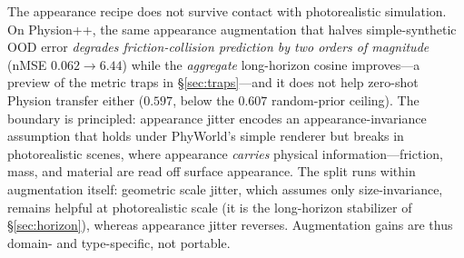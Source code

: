 The appearance recipe does not survive contact with photorealistic simulation. On Physion++, the same appearance augmentation that halves simple-synthetic OOD error \emph{degrades friction-collision prediction by two orders of magnitude} (nMSE $0.062\!\to\!6.44$) while the \emph{aggregate} long-horizon cosine improves---a preview of the metric traps in \S\ref{sec:traps}---and it does not help zero-shot Physion transfer either ($0.597$, below the $0.607$ random-prior ceiling). The boundary is principled: appearance jitter encodes an appearance-invariance assumption that holds under PhyWorld's simple renderer but breaks in photorealistic scenes, where appearance \emph{carries} physical information---friction, mass, and material are read off surface appearance. The split runs within augmentation itself: geometric scale jitter, which assumes only size-invariance, remains helpful at photorealistic scale (it is the long-horizon stabilizer of \S\ref{sec:horizon}), whereas appearance jitter reverses. Augmentation gains are thus domain- and type-specific, not portable.
